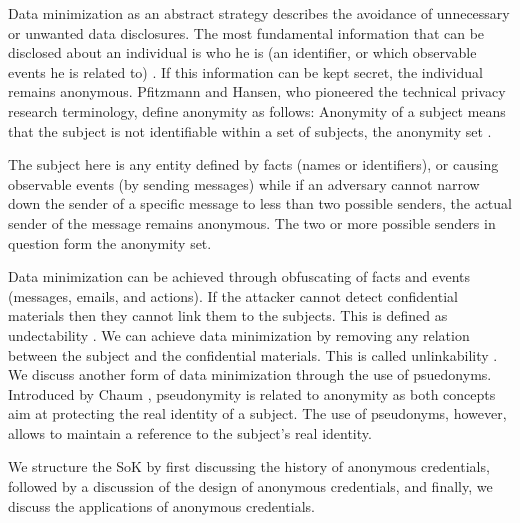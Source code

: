 Data minimization as an abstract strategy describes the avoidance of unnecessary or unwanted data disclosures. The most fundamental information that can be disclosed about an individual is who he is (an identifier, or which observable events he is related to) \cite{FISCHERHBNER2017759}. If this information can be kept secret, the individual remains anonymous. Pfitzmann and Hansen, who pioneered the technical privacy research terminology, define anonymity as follows: Anonymity of a subject means that the subject is not identifiable within a set of subjects, the anonymity set \cite{anon_terminology}. 

The subject here is any entity defined by facts (names or identifiers), or causing observable events (by sending messages) while if an adversary cannot narrow down the sender of a specific message to less than two possible senders, the actual sender of the message remains anonymous. The two or more possible senders in question form the anonymity
set.

Data minimization can be achieved through obfuscating of facts and events (messages, emails, and actions). If the attacker cannot detect confidential materials then they cannot link them to the subjects. This is defined as undectability \cite{anon_terminology}. We can achieve data minimization by removing any relation between the subject and the confidential materials. This is called unlinkability \cite{anon_terminology}. We discuss another form of data minimization through the use of psuedonyms. Introduced by Chaum \cite{Chaum1985}, pseudonymity is related to anonymity as both concepts aim at protecting the real identity of a subject. The use of pseudonyms, however, allows to maintain a reference to the subject's real identity.

We structure the SoK by first discussing the history of anonymous credentials, followed by a discussion of the design of anonymous credentials, and finally, we discuss the applications of anonymous credentials.

